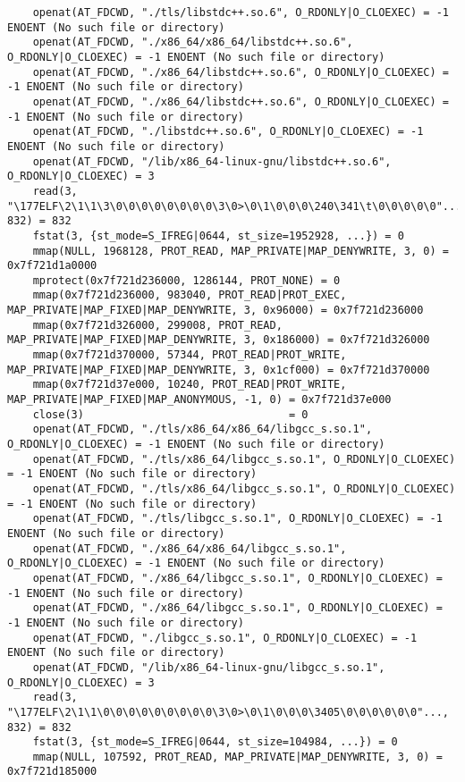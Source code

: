 \documentclass[pdf, unicode, 12pt, a4paper,oneside,fleqn]{article}
\begin{document}
{\begin{verbatim}
    openat(AT_FDCWD, "./tls/libstdc++.so.6", O_RDONLY|O_CLOEXEC) = -1 ENOENT (No such file or directory)
    openat(AT_FDCWD, "./x86_64/x86_64/libstdc++.so.6", O_RDONLY|O_CLOEXEC) = -1 ENOENT (No such file or directory)
    openat(AT_FDCWD, "./x86_64/libstdc++.so.6", O_RDONLY|O_CLOEXEC) = -1 ENOENT (No such file or directory)
    openat(AT_FDCWD, "./x86_64/libstdc++.so.6", O_RDONLY|O_CLOEXEC) = -1 ENOENT (No such file or directory)
    openat(AT_FDCWD, "./libstdc++.so.6", O_RDONLY|O_CLOEXEC) = -1 ENOENT (No such file or directory)
    openat(AT_FDCWD, "/lib/x86_64-linux-gnu/libstdc++.so.6", O_RDONLY|O_CLOEXEC) = 3
    read(3, "\177ELF\2\1\1\3\0\0\0\0\0\0\0\0\3\0>\0\1\0\0\0\240\341\t\0\0\0\0\0"..., 832) = 832
    fstat(3, {st_mode=S_IFREG|0644, st_size=1952928, ...}) = 0
    mmap(NULL, 1968128, PROT_READ, MAP_PRIVATE|MAP_DENYWRITE, 3, 0) = 0x7f721d1a0000
    mprotect(0x7f721d236000, 1286144, PROT_NONE) = 0
    mmap(0x7f721d236000, 983040, PROT_READ|PROT_EXEC, MAP_PRIVATE|MAP_FIXED|MAP_DENYWRITE, 3, 0x96000) = 0x7f721d236000
    mmap(0x7f721d326000, 299008, PROT_READ, MAP_PRIVATE|MAP_FIXED|MAP_DENYWRITE, 3, 0x186000) = 0x7f721d326000
    mmap(0x7f721d370000, 57344, PROT_READ|PROT_WRITE, MAP_PRIVATE|MAP_FIXED|MAP_DENYWRITE, 3, 0x1cf000) = 0x7f721d370000
    mmap(0x7f721d37e000, 10240, PROT_READ|PROT_WRITE, MAP_PRIVATE|MAP_FIXED|MAP_ANONYMOUS, -1, 0) = 0x7f721d37e000
    close(3)                                = 0
    openat(AT_FDCWD, "./tls/x86_64/x86_64/libgcc_s.so.1", O_RDONLY|O_CLOEXEC) = -1 ENOENT (No such file or directory)
    openat(AT_FDCWD, "./tls/x86_64/libgcc_s.so.1", O_RDONLY|O_CLOEXEC) = -1 ENOENT (No such file or directory)
    openat(AT_FDCWD, "./tls/x86_64/libgcc_s.so.1", O_RDONLY|O_CLOEXEC) = -1 ENOENT (No such file or directory)
    openat(AT_FDCWD, "./tls/libgcc_s.so.1", O_RDONLY|O_CLOEXEC) = -1 ENOENT (No such file or directory)
    openat(AT_FDCWD, "./x86_64/x86_64/libgcc_s.so.1", O_RDONLY|O_CLOEXEC) = -1 ENOENT (No such file or directory)
    openat(AT_FDCWD, "./x86_64/libgcc_s.so.1", O_RDONLY|O_CLOEXEC) = -1 ENOENT (No such file or directory)
    openat(AT_FDCWD, "./x86_64/libgcc_s.so.1", O_RDONLY|O_CLOEXEC) = -1 ENOENT (No such file or directory)
    openat(AT_FDCWD, "./libgcc_s.so.1", O_RDONLY|O_CLOEXEC) = -1 ENOENT (No such file or directory)
    openat(AT_FDCWD, "/lib/x86_64-linux-gnu/libgcc_s.so.1", O_RDONLY|O_CLOEXEC) = 3
    read(3, "\177ELF\2\1\1\0\0\0\0\0\0\0\0\0\3\0>\0\1\0\0\0\3405\0\0\0\0\0\0"..., 832) = 832
    fstat(3, {st_mode=S_IFREG|0644, st_size=104984, ...}) = 0
    mmap(NULL, 107592, PROT_READ, MAP_PRIVATE|MAP_DENYWRITE, 3, 0) = 0x7f721d185000

\end{verbatim}}
\end{document}
